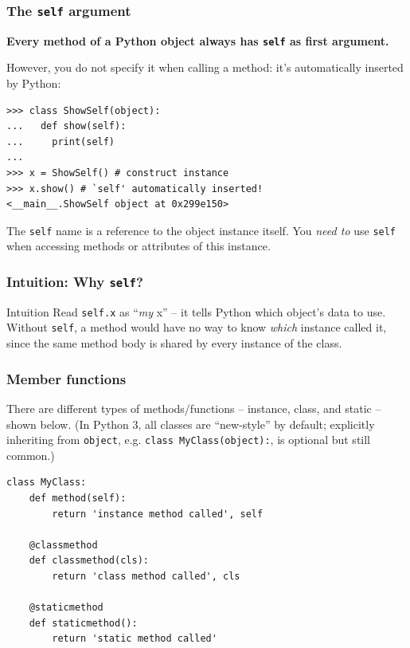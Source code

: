 \begin{frame}[fragile]\frametitle{The \texttt{self} argument}

  \textbf{Every method of a Python object always has \texttt{self}
    as first argument.}

  
  However, you do not specify it when calling a method: it's
  automatically inserted by Python:
\begin{lstlisting}
>>> class ShowSelf(object):
...   def show(self):
...     print(self)
...
>>> x = ShowSelf() # construct instance
>>> x.show() # `self' automatically inserted!
<__main__.ShowSelf object at 0x299e150>
\end{lstlisting}

  
  The \texttt{self} name is a reference to the object instance
  itself.  You \emph{need to} use \texttt{self} when accessing methods
  or attributes of this instance.
\end{frame}

\begin{frame}[fragile]\frametitle{Intuition: Why \texttt{self}?}
\begin{block}{Intuition}
Read \texttt{self.x} as ``\emph{my} x'' -- it tells Python which object's data to use. Without
\texttt{self}, a method would have no way to know \emph{which} instance called it, since the
same method body is shared by every instance of the class.
\end{block}
\end{frame}

\begin{frame}[fragile]\frametitle{Member functions}
There are different types of methods/functions -- instance, class, and static -- shown below.
(In Python 3, all classes are ``new-style'' by default; explicitly inheriting from
\texttt{object}, e.g. \texttt{class MyClass(object):}, is optional but still common.)
\begin{lstlisting}
class MyClass:
    def method(self):
        return 'instance method called', self

    @classmethod
    def classmethod(cls):
        return 'class method called', cls

    @staticmethod
    def staticmethod():
        return 'static method called'
\end{lstlisting}
\end{frame}


